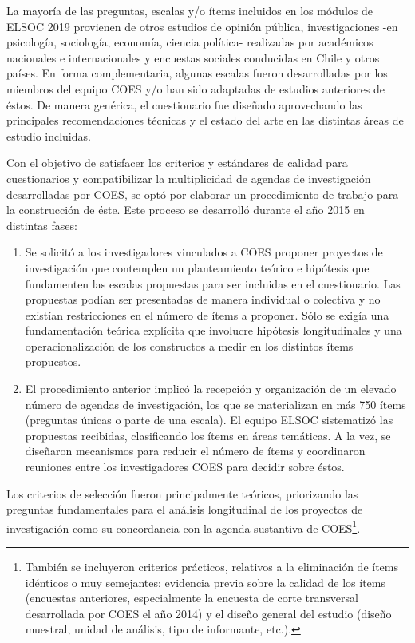\documentclass[
]{book}
\begin{document}
La mayoría de las preguntas, escalas y/o ítems incluidos en los módulos de ELSOC 2019 provienen de otros estudios de opinión pública, investigaciones -en psicología, sociología, economía, ciencia política- realizadas por académicos nacionales e internacionales y encuestas sociales conducidas en Chile y otros países. En forma complementaria, algunas escalas fueron desarrolladas por los miembros del equipo COES y/o han sido adaptadas de estudios anteriores de éstos. De manera genérica, el cuestionario fue diseñado aprovechando las principales recomendaciones técnicas y el estado del arte en las distintas áreas de estudio incluidas.

Con el objetivo de satisfacer los criterios y estándares de calidad para cuestionarios y compatibilizar la multiplicidad de agendas de investigación desarrolladas por COES, se optó por elaborar un procedimiento de trabajo para la construcción de éste. Este proceso se desarrolló durante el año 2015 en distintas fases:

\begin{enumerate}
\def\labelenumi{\arabic{enumi}.}
\item
  Se solicitó a los investigadores vinculados a COES proponer proyectos de investigación que contemplen un planteamiento teórico e hipótesis que fundamenten las escalas propuestas para ser incluidas en el cuestionario. Las propuestas podían ser presentadas de manera individual o colectiva y no existían restricciones en el número de ítems a proponer. Sólo se exigía una fundamentación teórica explícita que involucre hipótesis longitudinales y una operacionalización de los constructos a medir en los distintos ítems propuestos.
\item
  El procedimiento anterior implicó la recepción y organización de un elevado número de agendas de investigación, los que se materializan en más 750 ítems (preguntas únicas o parte de una escala). El equipo ELSOC sistematizó las propuestas recibidas, clasificando los ítems en áreas temáticas. A la vez, se diseñaron mecanismos para reducir el número de ítems y coordinaron reuniones entre los investigadores COES para decidir sobre éstos.
\end{enumerate}

Los criterios de selección fueron principalmente teóricos, priorizando las preguntas fundamentales para el análisis longitudinal de los proyectos de investigación como su concordancia con la agenda sustantiva de COES\footnote{También se incluyeron criterios prácticos, relativos a la eliminación de ítems idénticos o muy semejantes; evidencia previa sobre la calidad de los ítems (encuestas anteriores, especialmente la encuesta de corte transversal desarrollada por COES el año 2014) y el diseño general del estudio (diseño muestral, unidad de análisis, tipo de informante, etc.).}.
\end{document}
